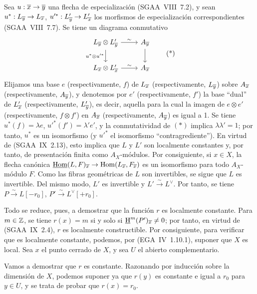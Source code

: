 Sea $u : \overline{x} \to \overline{y}$ una flecha de especialización (SGAA~VIII~7.2), y sean $u^{*} : L_{\overline{y}} \to L_{\overline{x}}$, $u'^{*} : L'_{\overline{y}} \to L'_{\overline{x}}$ los morfismos de especialización correspondientes (SGAA~VIII~7.7). Se tiene un diagrama conmutativo
\begin{equation}
\begin{tikzcd}
L_{\ol{y}} \otimes L'_{\ol{y}} \arrow[r,"\sim"] \arrow[d,"u^{*} \otimes u'^{*}"'] & A_{\ol{y}} \arrow[d] \\
L_{\ol{x}} \otimes L'_{\ol{x}} \arrow[r,"\sim"] & A_{\ol{x}}
\end{tikzcd}
\tag{*}
\end{equation}
Elijamos una base $e$ (respectivamente, $f$) de $L_{\overline{x}}$ (respectivamente, $L_{\overline{y}}$) sobre $A_{\overline{x}}$ (respectivamente, $A_{\overline{y}}$), y denotemos por $e'$ (respectivamente, $f'$) la base ``dual'' de $L'_{\overline{x}}$ (respectivamente, $L'_{\overline{y}}$), es decir, aquella para la cual la imagen de $e \otimes e'$ (respectivamente, $f \otimes f'$) en $A_{\overline{x}}$ (respectivamente, $A_{\overline{y}}$) es igual a 1. Se tiene $u^{*}(f) = \lambda e$, $u'^{*}(f') = \lambda' e'$, y la conmutatividad de $(*)$ implica $\lambda\lambda' = 1$; por tanto, $u^{*}$ es un isomorfismo (y $u'^{*}$ el isomorfismo ``contragrediente''). En virtud de (SGAA~IX~2.13), esto implica que $L$ y $L'$ son localmente constantes y, por tanto, de presentación finita como $A_X$-módulos. Por consiguiente, si $x \in X$, la flecha canónica $\underline{\operatorname{Hom}}(L,F)_{\overline{x}} \to \operatorname{Hom}(L_{\overline{x}}, F_{\overline{x}})$ es un isomorfismo para todo $A_X$-módulo $F$. Como las fibras geométricas de $L$ son invertibles, se sigue que $L$ es invertible. Del mismo modo, $L'$ es invertible y $L' \xrightarrow{\sim} L^{\vee}$. Por tanto, se tiene $P \xrightarrow{\sim} L[-r_0]$, $P' \xrightarrow{\sim} L^{\vee}[+r_0]$.

Todo se reduce, pues, a demostrar que la función $r$ es localmente constante. Para $m \in \mathbb{Z}$, se tiene $r(x) = m$ si y solo si $\underline{\mathrm H}^{m}(P')_{\overline{x}} \neq 0$; por tanto, en virtud de (SGAA~IX~2.4), $r$ es localmente constructible. Por consiguiente, para verificar que es localmente constante, podemos, por (EGA~IV~1.10.1), suponer que $X$ es local. Sea $x$ el punto cerrado de $X$, y sea $U$ el abierto complementario.

Vamos a demostrar que $r$ es constante. Razonando por inducción sobre la dimensión de $X$, podemos suponer ya que $r(y)$ es constante e igual a $r_0$ para $y \in U$, y se trata de probar que $r(x) = r_0$.

